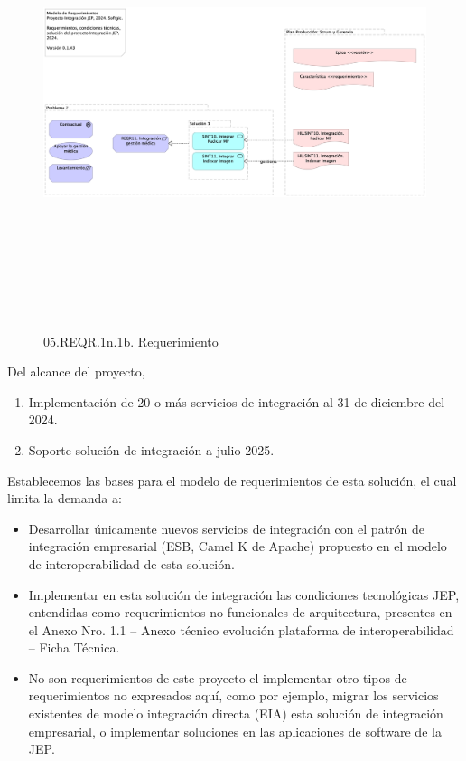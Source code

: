 \documentclass[
  paper=a4,
  ,captions=tableheading
]{scrartcl}
\providecommand{\tightlist}{%
  \setlength{\itemsep}{0pt}\setlength{\parskip}{0pt}}
\begin{document}
\begin{figure}
\centering
\includegraphics[width=\textwidth,height=5.20833in]{03.1b.contd.vista.png}
\caption{05.REQR.1n.1b. Requerimiento}
\end{figure}

Del alcance del proyecto,

\begin{enumerate}
\def\labelenumi{\arabic{enumi}.}
\tightlist
\item
  Implementación de 20 o más servicios de integración al 31 de diciembre
  del 2024.
\item
  Soporte solución de integración a julio 2025.
\end{enumerate}

Establecemos las bases para el modelo de requerimientos de esta
solución, el cual limita la demanda a:

\begin{itemize}
\tightlist
\item
  Desarrollar únicamente nuevos servicios de integración con el patrón
  de integración empresarial (ESB, Camel K de Apache) propuesto en el
  modelo de interoperabilidad de esta solución.
\item
  Implementar en esta solución de integración las condiciones
  tecnológicas JEP, entendidas como requerimientos no funcionales de
  arquitectura, presentes en el Anexo Nro. 1.1 -- Anexo técnico
  evolución plataforma de interoperabilidad -- Ficha Técnica.
\item
  No son requerimientos de este proyecto el implementar otro tipos de
  requerimientos no expresados aquí, como por ejemplo, migrar los
  servicios existentes de modelo integración directa (EIA) esta solución
  de integración empresarial, o implementar soluciones en las
  aplicaciones de software de la JEP.
\end{itemize}
\end{document}
